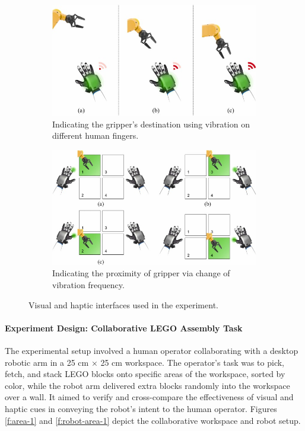 \begin{enumerate}
\begin{figure}[htp]
    \centering
    \begin{subfigure}{.5\textwidth}
        \centering
        \includegraphics[width=0.9\linewidth]{figs/haptic-cues.jpg}
        \caption{Indicating the gripper’s destination using vibration on different human fingers.}
        \label{fig:sfig1}
    \end{subfigure}%
    \begin{subfigure}{.5\textwidth}
        \centering
        \includegraphics[width=0.9\linewidth]{figs/visual-cues.jpg}
        \caption{Indicating the proximity of gripper via change of vibration frequency.}
        \label{fig:sfig2}
    \end{subfigure}
    \caption{Visual and haptic interfaces used in the experiment.}
    \label{fig:haptic-visual-cues}
\end{figure}

\paragraph{Experiment Design: Collaborative LEGO Assembly Task}
The experimental setup involved a human operator collaborating with a desktop robotic arm in a 25 cm × 25 cm workspace. The operator's task was to pick, fetch, and stack LEGO blocks onto specific areas of the workspace, sorted by color, while the robot arm delivered extra blocks randomly into the workspace over a wall. It aimed to verify and cross-compare the effectiveness of visual and haptic cues in conveying the robot’s intent to the human operator. Figures \ref{f:area-1} and \ref{f:robot-area-1} depict the collaborative workspace and robot setup.


\end{enumerate}
